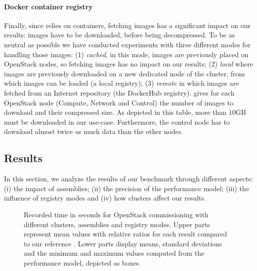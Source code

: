 \paragraph{Docker container registry}
Finally, since \kolla relies on \docker containers, fetching \docker images has a
significant impact on our results: images have to be downloaded, before being
decompressed. To be as neutral as possible we have conducted experiments with
three different modes for handling those images: (1) \emph{cached}, in this mode,
images are previously placed on OpenStack nodes, so fetching \docker images has
no impact on our results; (2) \emph{local} where images are previously
downloaded on a new dedicated node of the cluster, from which images can be
loaded (\ie a local \docker registry); (3) \emph{remote} in which images are
fetched from an Internet repository (\ie the DockerHub registry).
 gives for each OpenStack node (\ie Compute, Network and
Control) the number of \docker images to download and their compressed size.
As depicted in this table, more than $10$GB must be downloaded in our use-case.
Furthermore, the control node has to download almost twice as much data than the
other nodes.

\subsection{Results}

In this section, we analyze the results of our benchmark through different
aspects: (i) the impact of assemblies; (ii) the precision of the performance
model; (iii) the influence of registry modes and (iv) how clusters affect our
results.

\begin{figure}[t!]
  \begin{center}
    \def\svgwidth{\columnwidth}
    \def\svgwidth{\columnwidth}
    \caption{Recorded time in seconds for OpenStack commissioning with different
    clusters, assemblies and registry modes. Upper parts represent mean values
    with relative ratios for each result compared to our reference \ansass.
    Lower parts display means, standard deviations and the minimum and maximum
    values computed from the performance model, depicted as boxes.}
    \label{fig:openstack_results}
  \end{center}
\end{figure}

